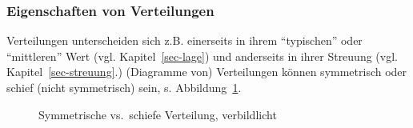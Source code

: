 \documentclass[
  letterpaper,
]{scrbook}
\theoremstyle{definition}
\theoremstyle{definition}
\theoremstyle{definition}
\theoremstyle{remark}
\begin{document}
\subsubsection{Eigenschaften von
Verteilungen}\label{eigenschaften-von-verteilungen}

Verteilungen unterscheiden sich z.B. einerseits in ihrem
\enquote{typischen} oder \enquote{mittleren} Wert (vgl.
Kapitel~\ref{sec-lage}) und anderseits in ihrer Streuung (vgl.
Kapitel~\ref{sec-streuung}.) (Diagramme von) Verteilungen können
symmetrisch oder schief (nicht symmetrisch) sein, s.
Abbildung~\ref{fig-symm-schief}.

\begin{figure}

\begin{minipage}{0.50\linewidth}



\end{minipage}%
%
\begin{minipage}{0.50\linewidth}



\end{minipage}%

\caption{\label{fig-symm-schief}Symmetrische vs.~schiefe Verteilung,
verbildlicht}

\end{figure}%
\end{document}
